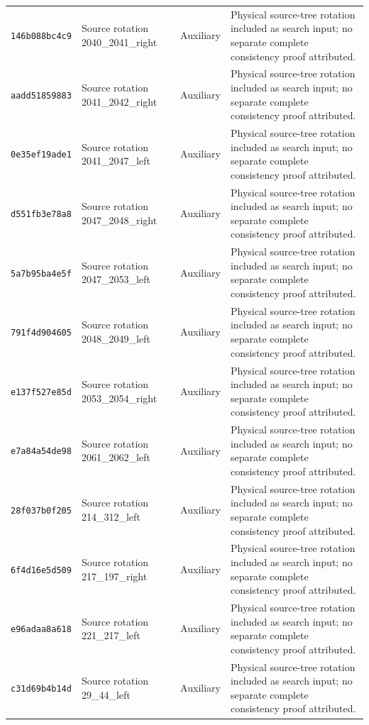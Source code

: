 {\begin{longtable}{@{}>{\raggedright\arraybackslash}p{}>{\raggedright\arraybackslash}p{}>{\raggedright\arraybackslash}p{}>{\raggedright\arraybackslash}p{}@{}}
\texttt{146b088bc4c9} & Source rotation 2040\_2041\_right & Auxiliary & Physical source-tree rotation included as search input; no separate complete consistency proof attributed.\\[3pt]
\texttt{aadd51859883} & Source rotation 2041\_2042\_right & Auxiliary & Physical source-tree rotation included as search input; no separate complete consistency proof attributed.\\[3pt]
\texttt{0e35ef19ade1} & Source rotation 2041\_2047\_left & Auxiliary & Physical source-tree rotation included as search input; no separate complete consistency proof attributed.\\[3pt]
\texttt{d551fb3e78a8} & Source rotation 2047\_2048\_right & Auxiliary & Physical source-tree rotation included as search input; no separate complete consistency proof attributed.\\[3pt]
\texttt{5a7b95ba4e5f} & Source rotation 2047\_2053\_left & Auxiliary & Physical source-tree rotation included as search input; no separate complete consistency proof attributed.\\[3pt]
\texttt{791f4d904605} & Source rotation 2048\_2049\_left & Auxiliary & Physical source-tree rotation included as search input; no separate complete consistency proof attributed.\\[3pt]
\texttt{e137f527e85d} & Source rotation 2053\_2054\_right & Auxiliary & Physical source-tree rotation included as search input; no separate complete consistency proof attributed.\\[3pt]
\texttt{e7a84a54de98} & Source rotation 2061\_2062\_left & Auxiliary & Physical source-tree rotation included as search input; no separate complete consistency proof attributed.\\[3pt]
\texttt{28f037b0f205} & Source rotation 214\_312\_left & Auxiliary & Physical source-tree rotation included as search input; no separate complete consistency proof attributed.\\[3pt]
\texttt{6f4d16e5d509} & Source rotation 217\_197\_right & Auxiliary & Physical source-tree rotation included as search input; no separate complete consistency proof attributed.\\[3pt]
\texttt{e96adaa8a618} & Source rotation 221\_217\_left & Auxiliary & Physical source-tree rotation included as search input; no separate complete consistency proof attributed.\\[3pt]
\texttt{c31d69b4b14d} & Source rotation 29\_44\_left & Auxiliary & Physical source-tree rotation included as search input; no separate complete consistency proof attributed.\\[3pt]

\end{longtable}}
